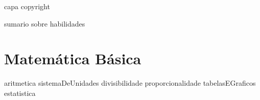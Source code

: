\documentclass[11pt,fleqn]{book}
\begin{document}
{capa} %
{copyright} %

{sumario} %
{sobre} %
{habilidades} %

\part{Matemática Básica}
{aritmetica}
{sistemaDeUnidades}
{divisibilidade}
{proporcionalidade}
{tabelasEGraficos}
{estatistica}



\end{document}

